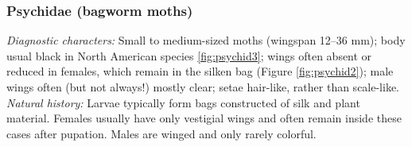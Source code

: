 \documentclass[letterpaper, 11pt]{article}
\begin{document}
\subsubsection{Psychidae (bagworm moths)}
\noindent{}\textit{Diagnostic characters:} Small to medium-sized moths (wingspan 12--36 mm); body usual black in North American species \ref{fig:psychid3}; wings often absent or reduced in females, which remain in the silken bag (Figure \ref{fig:psychid2}); male wings often (but not always!) mostly clear; setae hair-like, rather than scale-like.\\

\noindent{}\textit{Natural history:} Larvae typically form bags constructed of silk and plant material. Females usually have only vestigial wings and often remain inside these cases after pupation. Males are winged and only rarely colorful.
\end{document}

